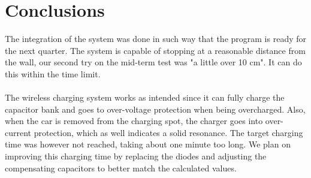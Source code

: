 \documentclass[final]{scrreprt} %
\begin{document}
\chapter{Conclusions}

The integration of the system was done in such way that the program is ready for the next quarter.
The system is capable of stopping at a reasonable distance from the wall, our second try on the mid-term test was "a little over 10 cm".
It can do this within the time limit.
\\ \\
The wireless charging system works as intended since it can fully charge the capacitor bank and goes to over-voltage protection when being overcharged.
Also, when the car is removed from the charging spot, the charger goes into over-current protection, which as well indicates a solid resonance.
The target charging time was however not reached, taking about one minute too long.
We plan on improving this charging time by replacing the diodes and adjusting the compensating capacitors to better match the calculated values.
\end{document}
